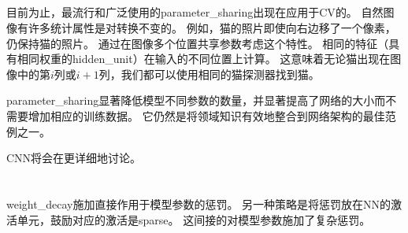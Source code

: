 \subsection{}
目前为止，最流行和广泛使用的\gls{parameter_sharing}出现在应用于\gls{CV}的。
自然图像有许多统计属性是对转换不变的。
例如，猫的照片即使向右边移了一个像素，仍保持猫的照片。
通过在图像多个位置共享参数考虑这个特性。
相同的特征（具有相同权重的\gls{hidden_unit}）在输入的不同位置上计算。
这意味着无论猫出现在图像中的第$i$列或$i + 1$列，我们都可以使用相同的猫探测器找到猫。

\gls{parameter_sharing}显著降低模型不同参数的数量，并显著提高了网络的大小而不需要增加相应的训练数据。
它仍然是将领域知识有效地整合到网络架构的最佳范例之一。

\gls{CNN}将会在更详细地讨论。

\section{}
\label{sec:sparse_representations}
\gls{weight_decay}施加直接作用于模型参数的惩罚。
另一种策略是将惩罚放在\gls{NN}的激活单元，鼓励对应的激活是\gls{sparse}。
这间接的对模型参数施加了复杂惩罚。


